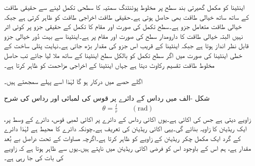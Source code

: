 اینٹینا کو مکمل گھیرتی بند سطح پر مخلوط پوئنٹنگ سمتیہ کا سطحی تکمل لینے سے حقیقی طاقت کے ساتھ ساتھ خیالی طاقت بھی حاصل ہوتی ہے۔حقیقی طاقت اخراجی طاقت کو ظاہر کرتی ہے جبکہ خیالی طاقت  متعامل جزو ہے۔سطح تکمل کی صورت اور مقام کا تکمل کے حقیقی جزو پر کوئی اثر نہیں البتہ خیالی طاقت کا دارومدار سطح کی صورت اور مقام پر ہے۔اینٹینا سے بہت دُور خیالی جزو قابل نظر انداز ہوتا ہے جبکہ اینٹینا کے قریب اس جزو کی مقدار بڑھ جاتی ہے۔نہایت پتلی ساخت کے خطی اینٹینا کی صورت میں اگر سطح تکمل کو بالکل سطح اینٹینا کے ساتھ ملا لیا جائے تب حاصل مخلوط طاقت تقسیم  رکاوٹ  دیتا ہے جہاں  اینٹینا کے اخراجی مزاحمت کو ظاہر کرتا ہے۔

اگلے حصے میں  درکار ہو گا لہٰذا اسے پہلے سمجھتے ہیں۔

شکل -الف میں رداس  کے دائرے پر قوس کی لمبائی  اور  رداس  کی شرح
\begin{align}\label{مساوات_اینٹینا_ریڈیئن_تعریف}
\theta=\frac{l}{r} \quad \quad (\si{\radian})
\end{align}
 زاویے  دیتی ہے جس کی اکائی   ہے۔یوں اکائی رداس کے دائرے پر اکائی لمبی قوس، دائرے کے وسط پر، ایک ریڈیئن  کا زاویہ بنائے گی۔یہی اکائی ریڈیئن کی تعریف ہے۔چونکہ دائرے کا محیط  ہے لہٰذا دائرے کے گرد ایک مکمل چکر  ریڈیئن  کے زاویے کو ظاہر کرتا ہے۔اگرچہ مساوات  کے تحت  دراصل بے بُعد مقدار ہے، ہم اس کے باوجود اس کو فرضی اکائی ریڈیئن میں ناپتے ہیں۔یوں  سے ظاہر ہوتا ہے کہ  زاویے کی بات کی جا رہی ہے۔

